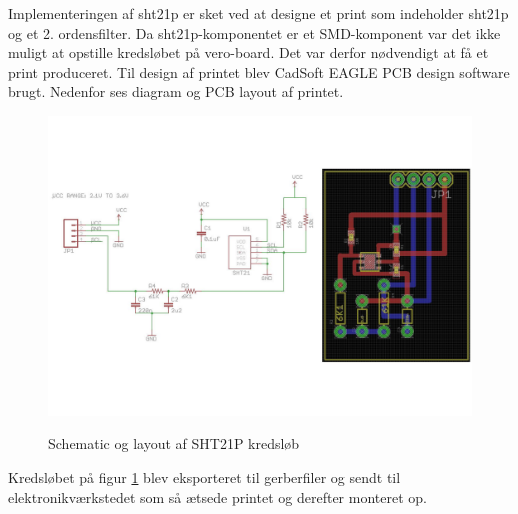 Implementeringen af sht21p er sket ved at designe et print som indeholder sht21p og et 2. ordensfilter. 
Da sht21p-komponentet er et SMD-komponent var det ikke muligt at opstille kredsløbet på vero-board. Det var derfor nødvendigt at få et print produceret. Til design af printet blev CadSoft EAGLE PCB design software brugt. Nedenfor ses diagram og PCB layout af printet.


\begin{figure}[htb]
\centering
{\includegraphics[width=\textwidth]{filer/implementering/SHT21P-pcb-sch}}
\caption{Schematic og layout af SHT21P kredsl\o{}b}
\label{lab:SHT21P-kredsloeb}
\end{figure}

Kredsløbet på figur \ref{lab:SHT21P-kredsloeb} blev eksporteret til gerberfiler og sendt til elektronikværkstedet som så ætsede printet og derefter monteret op.

